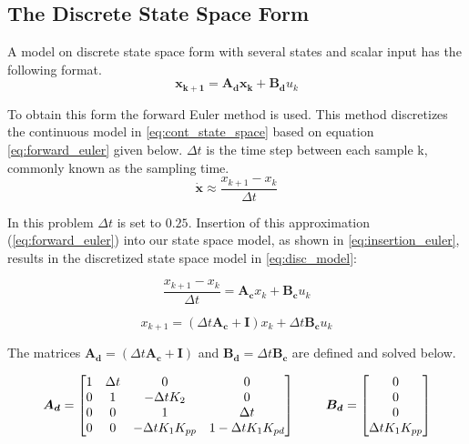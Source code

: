 \documentclass[a4paper, 12pt]{article}\usepackage[utf8]{inputenc}
\begin{document}
 \subsection{The Discrete State Space Form}
 A model on discrete state space form with several states and scalar input has the following format.
 \begin{equation}
    \boldsymbol{x_{k+1}} = \boldsymbol{A_d}\boldsymbol{x_k} + \boldsymbol{B_d} u_k
 \end{equation}
 
 To obtain this form the forward Euler method is used. This method discretizes the continuous model in \ref{eq:cont_state_space} based on equation \ref{eq:forward_euler} given below. $\Delta{t}$ is the time step between each sample k, commonly known as the sampling time. 
 \begin{equation} \label{eq:forward_euler}
    \boldsymbol{\dot{x}} \approx \frac{x_{k+1}-x_k}{\Delta{t}} 
 \end{equation}
 
  In this problem $\Delta{t}$ is set to $0.25$. Insertion of this approximation (\ref{eq:forward_euler}) into our state space model, as shown in \ref{eq:insertion_euler}, results in the discretized state space model in \ref{eq:disc_model}:
 
 \begin{equation}\label{eq:insertion_euler}
    \frac{x_{k+1}-x_k}{\Delta{t}}=\boldsymbol{A_c} x_k+ \boldsymbol{B_c} u_k 
 \end{equation}
 
 \begin{equation}\label{eq:disc_model}
    x_{k+1}=(\Delta{t}\boldsymbol{A_c}+\boldsymbol{I}) x_k+ \Delta{t} \boldsymbol{B_c} u_k 
 \end{equation}
 
 The matrices $\boldsymbol{A_d} = (\Delta{t}\boldsymbol{A_c}+\boldsymbol{I})$ and $\boldsymbol{B_d} = \Delta{t} \boldsymbol{B_c}$ are defined and solved below.
 
\begin{equation}
     \boldsymbol{A_d}=\begin{bmatrix}
    1 & \Delta{t} & 0 & 0\\
    0 & 1 & -\Delta{t}K_2 & 0\\
    0 & 0 & 1 & \Delta{t}\\
    0 & 0 & -\Delta{t}K_1K_{pp} & 1-\Delta{t}K_{1}K_{pd}\\
    \end{bmatrix}
    \begin{tabular}{cc}
         &  \\
         & 
    \end{tabular}
    \boldsymbol{B_d}=\begin{bmatrix}
    0\\
    0\\
    0\\
    \Delta{t} K_1K_{pp}\\
    \end{bmatrix} 
\end{equation}    
\end{document}
